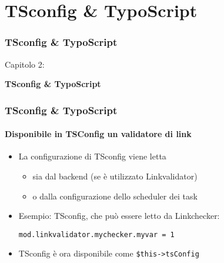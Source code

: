 %

\section{TSconfig \& TypoScript}
\begin{frame}[fragile]
	\frametitle{TSconfig \& TypoScript}

	\begin{center}\huge{Capitolo 2:}\end{center}
	\begin{center}\huge{\color{typo3darkgrey}\textbf{TSconfig \& TypoScript}}\end{center}

\end{frame}


\begin{frame}[fragile]
	\frametitle{TSconfig \& TypoScript}
	\framesubtitle{Disponibile in TSConfig un validatore di link}

	\begin{itemize}
		\item La configurazione di TSconfig viene letta

			\begin{itemize}
				\item sia dal backend (se è utilizzato Linkvalidator) 
				\item o dalla configurazione dello scheduler dei task 
			\end{itemize}

		\item Esempio: TSconfig, che può essere letto da Linkchecker:

			\lstinline!mod.linkvalidator.mychecker.myvar = 1!

		\item TSconfig è ora disponibile come \texttt{\$this->tsConfig}
	\end{itemize}

\end{frame}

